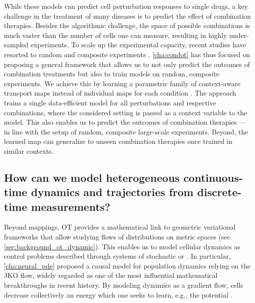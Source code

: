  While these models can predict cell perturbation responses to single drugs, a key challenge in the treatment of many diseases is to predict the effect of combination therapies. Besides the algorithmic challenge, the space of possible combinations is much vaster than the number of cells one can measure, resulting in highly under-sampled experiments. To scale up the experimental capacity, recent studies have resorted to random and composite experiments \citep{norman2019exploring, cleary2020necessity}.
\cref{cha:condot} has thus focused on proposing a general framework that allows us to not only predict the outcomes of combination treatments but also to train models on random, composite experiments.
We achieve this by learning a parametric family of context-aware transport maps instead of individual maps for each condition \citep{bunne2022supervised}.
The approach trains a single data-efficient model for all perturbations and respective combinations, where the considered setting is passed as a context variable to the model. 
This also enables us to predict the outcomes of combination therapies ---in line with the setup of random, composite large-scale experiments.
Beyond, the learned map can generalize to unseen combination therapies once trained in similar contexts.


\subsection*{\textbf{How can we model heterogeneous continuous-time dynamics and trajectories from discrete-time measurements?}}

Beyond mappings, \acrshort{OT} provides a mathematical link to geometric variational frameworks that allow studying flows of distributions on metric spaces (see \cref{sec:background_ot_dynamic}).
This enables us to model cellular dynamics as control problems described through systems of stochastic \citep[\cref{cha:neural_sde}]{bunne2022recovering, somnath2023aligned} or  \citep[\cref{cha:neural_pde}]{bunne2022proximal}.
In particular, \cref{cha:neural_pde} proposed a causal model for population dynamics relying on the \acrlong{JKO} flow, widely regarded as one of the most influential mathematical breakthroughs in recent history. By modeling dynamics as a gradient flow, cells decrease collectively an energy which one seeks to learn, e.g., the \citeauthor{waddington1957strategy} potential \citep{bunne2022proximal}. 

